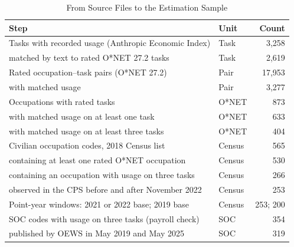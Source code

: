 \documentclass[12pt]{article}
\theoremstyle{plain}
\theoremstyle{definition}
\theoremstyle{remark}
\begin{document}
\begin{table}[t]
\centering\small
\caption{From Source Files to the Estimation Sample}
\label{tab:funnel}
\begin{tabular}{@{}llr@{}}
\toprule
Step & Unit & Count \\
\midrule
Tasks with recorded usage (Anthropic Economic Index) & Task & 3,258 \\
\quad matched by text to rated O*NET 27.2 tasks & Task & 2,619 \\
Rated occupation--task pairs (O*NET 27.2) & Pair & 17,953 \\
\quad with matched usage & Pair & 3,277 \\
Occupations with rated tasks & O*NET & 873 \\
\quad with matched usage on at least one task & O*NET & 633 \\
\quad with matched usage on at least three tasks & O*NET & 404 \\
Civilian occupation codes, 2018 Census list & Census & 565 \\
\quad containing at least one rated O*NET occupation & Census & 530 \\
\quad containing an occupation with usage on three tasks & Census & 266 \\
\quad observed in the CPS before and after November 2022 & Census & 253 \\
Point-year windows: 2021 or 2022 base; 2019 base & Census & 253; 200 \\
SOC codes with usage on three tasks (payroll check) & SOC & 354 \\
\quad published by OEWS in May 2019 and May 2025 & SOC & 319 \\
\bottomrule
\end{tabular}
\end{table}
\end{document}

